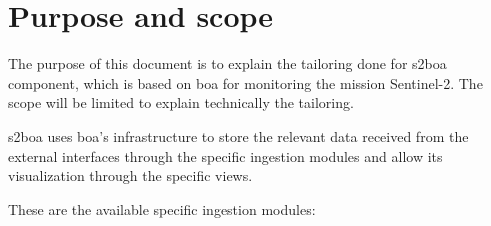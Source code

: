 \chapter{Purpose and scope}

The purpose of this document is to explain the tailoring done for \acrshort{s2}\acrshort{boa} component, which is based on \acrshort{boa} for monitoring the mission Sentinel-2. The scope will be limited to explain technically the tailoring.

\acrshort{s2}\acrshort{boa} uses \acrshort{boa}'s infrastructure to store the relevant data received from the external interfaces through the specific ingestion modules and allow its visualization through the specific views.

These are the available specific ingestion modules:

